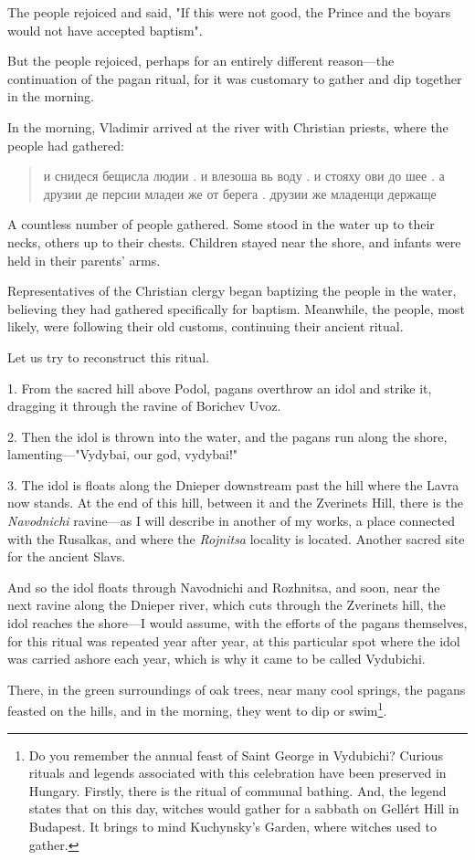 \documentclass[a5paper,11pt,openany]{article}
\begin{document}
The people rejoiced and said, "If this were not good, the Prince and the boyars would not have accepted baptism".

But the people rejoiced, perhaps for an entirely different reason—the continuation of the pagan ritual, for it was customary to gather and dip together in the morning.

In the morning, Vladimir arrived at the river with Christian priests, where the people had gathered:
 
\begin{quotation}
\noindent и снидеся бещисла людии . и влезоша вь воду . и стояху ови до шее . а друзии де персии младеи же от берега . друзии же младенци держаще
\end{quotation}

A countless number of people gathered. Some stood in the water up to their necks, others up to their chests. Children stayed near the shore, and infants were held in their parents' arms.

Representatives of the Christian clergy began baptizing the people in the water, believing they had gathered specifically for baptism. Meanwhile, the people, most likely, were following their old customs, continuing their ancient ritual.

Let us try to reconstruct this ritual.

1. From the sacred hill above Podol, pagans overthrow an idol and strike it, dragging it through the ravine of Borichev Uvoz.

2. Then the idol is thrown into the water, and the pagans run along the shore, lamenting—"Vydybai, our god, vydybai!"

3. The idol is floats along the Dnieper downstream past the hill where the Lavra now stands. At the end of this hill, between it and the Zverinets Hill, there is the \textit{Navodnichi} ravine—as I will describe in another of my works, a place connected with the Rusalkas, and where the \textit{Rojnitsa} locality is located. Another sacred site for the ancient Slavs.

And so the idol floats through Navodnichi and Rozhnitsa, and soon, near the next ravine along the Dnieper river, which cuts through the Zverinets hill, the idol reaches the shore—I would assume, with the efforts of the pagans themselves, for this ritual was repeated year after year, at this particular spot where the idol was carried ashore each year, which is why it came to be called Vydubichi.

There, in the green surroundings of oak trees, near many cool springs, the pagans feasted on the hills, and in the morning, they went to dip or swim\footnote{Do you remember the annual feast of Saint George in Vydubichi? Curious rituals and legends associated with this celebration have been preserved in Hungary. Firstly, there is the ritual of communal bathing. And, the legend states that on this day, witches would gather for a sabbath on Gellért Hill in Budapest. It brings to mind Kuchynsky’s Garden, where witches used to gather.}.
\end{document}
